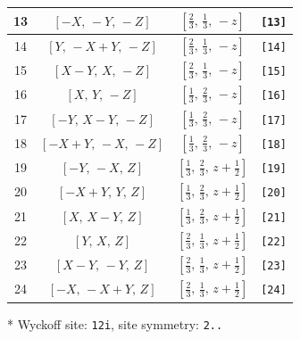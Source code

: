 \documentclass[fleqn,8pt]{jsarticle}
\begin{document}
\begin{longtable}{cccc}
13 & $\left[ - X,\, - Y,\, - Z \right]$ & $\left[ \frac{2}{3},\, \frac{1}{3},\, - z \right]$ & {\tt [13]} \\ \hline
14 & $\left[ Y,\, - X + Y,\, - Z \right]$ & $\left[ \frac{2}{3},\, \frac{1}{3},\, - z \right]$ & {\tt [14]} \\ \hline
15 & $\left[ X - Y,\, X,\, - Z \right]$ & $\left[ \frac{2}{3},\, \frac{1}{3},\, - z \right]$ & {\tt [15]} \\ \hline
16 & $\left[ X,\, Y,\, - Z \right]$ & $\left[ \frac{1}{3},\, \frac{2}{3},\, - z \right]$ & {\tt [16]} \\ \hline
17 & $\left[ - Y,\, X - Y,\, - Z \right]$ & $\left[ \frac{1}{3},\, \frac{2}{3},\, - z \right]$ & {\tt [17]} \\ \hline
18 & $\left[ - X + Y,\, - X,\, - Z \right]$ & $\left[ \frac{1}{3},\, \frac{2}{3},\, - z \right]$ & {\tt [18]} \\ \hline
19 & $\left[ - Y,\, - X,\, Z \right]$ & $\left[ \frac{1}{3},\, \frac{2}{3},\, z + \frac{1}{2} \right]$ & {\tt [19]} \\ \hline
20 & $\left[ - X + Y,\, Y,\, Z \right]$ & $\left[ \frac{1}{3},\, \frac{2}{3},\, z + \frac{1}{2} \right]$ & {\tt [20]} \\ \hline
21 & $\left[ X,\, X - Y,\, Z \right]$ & $\left[ \frac{1}{3},\, \frac{2}{3},\, z + \frac{1}{2} \right]$ & {\tt [21]} \\ \hline
22 & $\left[ Y,\, X,\, Z \right]$ & $\left[ \frac{2}{3},\, \frac{1}{3},\, z + \frac{1}{2} \right]$ & {\tt [22]} \\ \hline
23 & $\left[ X - Y,\, - Y,\, Z \right]$ & $\left[ \frac{2}{3},\, \frac{1}{3},\, z + \frac{1}{2} \right]$ & {\tt [23]} \\ \hline
24 & $\left[ - X,\, - X + Y,\, Z \right]$ & $\left[ \frac{2}{3},\, \frac{1}{3},\, z + \frac{1}{2} \right]$ & {\tt [24]} \\
\end{longtable}
* Wyckoff site: {\tt 12i}, site symmetry: {\tt 2..}
\renewcommand{\arraystretch}{1.2}
\end{document}

